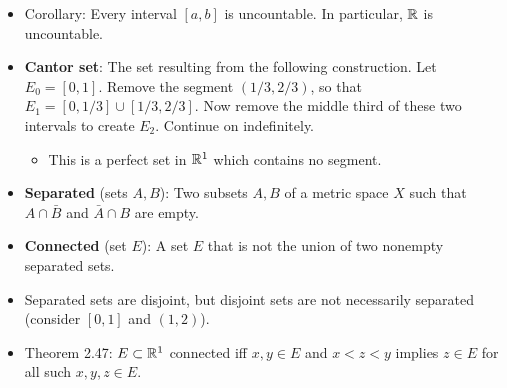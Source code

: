 \documentclass[../../notes.tex]{subfiles}
\begin{document}
\begin{itemize}
\begin{proof}
        Let $K_n=\bar{V}_n\cap P$. Since $\bar{V}_n$ is closed and bounded, $\bar{V}_n$ is compact. Additionally, since $\x_n\notin K_{n+1}$ for each $n$, no point of $P$ lies in $\bigcap_1^\infty K_n$. Thus, since each $K_n\subset P$, $\bigcap_1^\infty K_n$ is empty. But this contradicts our previous result that since each $K_n$ is nonempty, compact, and such that $K_n\supset K_{n+1}$, $\bigcap_1^\infty K_n$ is nonempty.
    \end{proof}
    \item Corollary: Every interval $[a,b]$ is uncountable. In particular, $\mathbb{R}$ is uncountable.
    \item \textbf{Cantor set}: The set resulting from the following construction. Let $E_0=[0,1]$. Remove the segment $(1/3,2/3)$, so that $E_1=[0,1/3]\cup[1/3,2/3]$. Now remove the middle third of these two intervals to create $E_2$. Continue on indefinitely.
    \begin{itemize}
        \item This is a perfect set in $\mathbb{R}^1$ which contains no segment.
    \end{itemize}
    \item \textbf{Separated} (sets $A,B$): Two subsets $A,B$ of a metric space $X$ such that $A\cap\bar{B}$ and $\bar{A}\cap B$ are empty.
    \item \textbf{Connected} (set $E$): A set $E$ that is not the union of two nonempty separated sets.
    \item Separated sets are disjoint, but disjoint sets are not necessarily separated (consider $[0,1]$ and $(1,2)$).
    \item Theorem 2.47: $E\subset\mathbb{R}^1$ connected iff $x,y\in E$ and $x<z<y$ implies $z\in E$ for all such $x,y,z\in E$.
\end{itemize}
\end{document}
